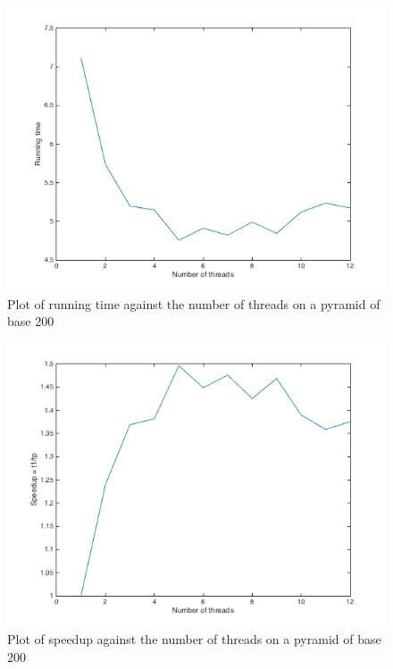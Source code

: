 \documentclass[11pt]{article}
\begin{document}
\begin{figure}[H]
\begin{center}
\includegraphics[width=12cm]{strongplot}
\caption{Plot of running time against the number of threads on a pyramid of base 200}
\label{fig:strongscaling}
\end{center}
\end{figure}

\begin{figure}[H]
\begin{center}
\includegraphics[width=12cm]{speedupstrong}
\caption{Plot of speedup against the number of threads on a pyramid of base 200}
\label{fig:speedupstrong}
\end{center}
\end{figure}
\end{document}
